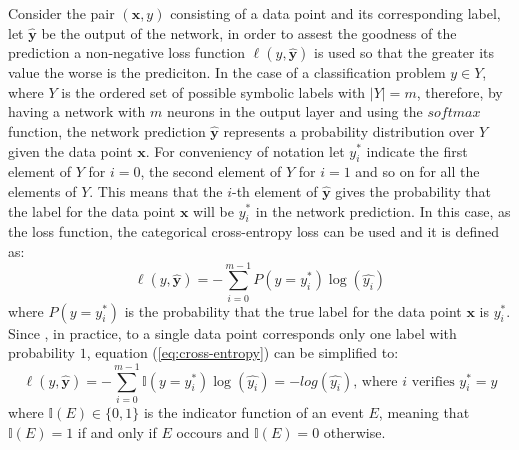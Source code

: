\documentclass[12pt]{article}
\newcommand{\vect}[1]{\boldsymbol{#1}}
\begin{document}
Consider the pair $(\vect{x}, y)$ consisting of a data point and its corresponding label, let $\vect{\hat{{y}}}$ be the output of the network, in order to assest the goodness of the prediction a non-negative loss function $\ell(y,\vect{\hat{y}})$ is used so that the greater its value the worse is the prediciton. In the case of a classification problem $y \in Y$, where $Y$ is the ordered set of possible symbolic labels with $|Y| = m$, therefore, by having a network with $m$ neurons in the output layer and using the $softmax$ function, the network prediction $\vect{\hat{y}}$ represents a probability distribution over $Y$ given the data point $\vect{x}$. For conveniency of notation let $y^*_i$ indicate the first element of $Y$ for $i = 0$, the second element of $Y$ for $i = 1$ and so on for all the elements of $Y$. This means that the $i$-th element of $\vect{\hat{y}}$ gives the probability that the label for the data point $\vect{x}$ will be $y^*_i$ in the network prediction. In this case, as the loss function, the categorical cross-entropy loss can be used and it is defined as:
\begin{equation}
\label{eq:cross-entropy}
\ell(y,\vect{\hat{y}}) = -\sum_{i=0}^{m-1}{P(y = y^*_i)\log(\hat{y_i})} 
\end{equation}
where $P(y = y^*_i)$ is the probability that the true label for the data point $\vect{x}$ is $y^*_i$. Since , in practice, to a single data point corresponds only one label with probability $1$, equation (\ref{eq:cross-entropy}) can be simplified to:
$$
\ell(y,\vect{\hat{y}}) = -\sum_{i=0}^{m-1}{\mathbb{I}(y = y^*_i)\log(\hat{y_i})}  = -log(\hat{y_i}) \text{, where } i \text{ verifies } y^*_i = y
$$
where $\mathbb{I}(E) \in \{0, 1\}$ is the indicator function of an event $E$, meaning that $\mathbb{I}(E) = 1$ if and only if $E$ occours and $\mathbb{I}(E) = 0$ otherwise.
\end{document}
